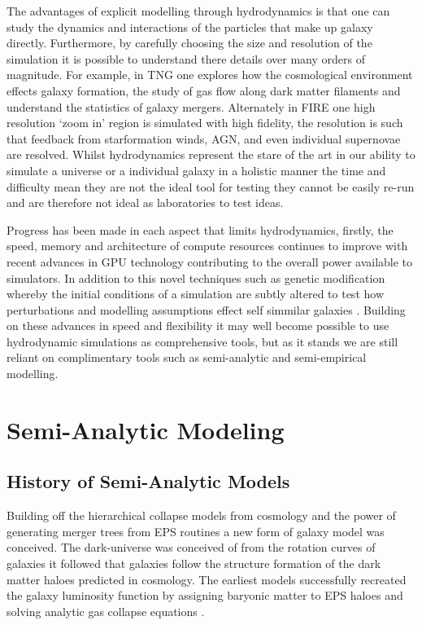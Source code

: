 The advantages of explicit modelling through hydrodynamics is that one can study the dynamics and interactions of the particles that make up galaxy directly. Furthermore, by carefully choosing the size and resolution of the simulation it is possible to understand there details over many orders of magnitude. For example, in TNG one explores how the cosmological environment effects galaxy formation, the study of gas flow along dark matter filaments and understand the statistics of galaxy mergers. Alternately in FIRE one high resolution `zoom in' region is simulated with high fidelity, the resolution is such that feedback from starformation winds, AGN, and even individual supernovae are resolved. Whilst hydrodynamics represent the stare of the art in our ability to simulate a universe or a individual galaxy in a holistic manner the time and difficulty mean they are not the ideal tool for testing they cannot be easily re-run and are therefore not ideal as laboratories to test ideas. 

Progress has been made in each aspect that limits hydrodynamics, firstly, the speed, memory and architecture of compute resources continues to improve with recent advances in GPU technology contributing to the overall power available to simulators. In addition to this novel techniques such as genetic modification whereby the initial conditions of a simulation are subtly altered to test how perturbations and modelling assumptions effect self simmilar galaxies \citep{Pontzen2017HowGalaxy}. Building on these advances in speed and flexibility it may well become possible to use hydrodynamic simulations as comprehensive tools, but as it stands we are still reliant on complimentary tools such as semi-analytic and semi-empirical modelling.

\section{Semi-Analytic Modeling}
\label{sec:SAM}
\subsection{History of Semi-Analytic Models}
Building off the hierarchical collapse models from \LCDM cosmology and the power of generating merger trees from EPS routines \citep{Press1974} a new form of galaxy model was conceived. The dark-universe was conceived of from the rotation curves of galaxies it followed that galaxies follow the structure formation of the dark matter haloes predicted in \LCDM cosmology. The earliest models successfully recreated the galaxy luminosity function by assigning baryonic matter to EPS haloes and solving analytic gas collapse equations \citep{White1978CoreClustering}.

